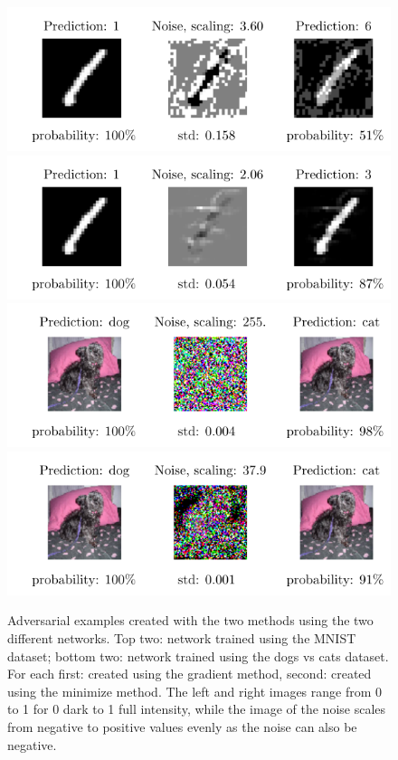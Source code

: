 \documentclass[%
 reprint,
 amsmath,amssymb,
 aps,
]{revtex4-1}
\begin{document}
\begin{figure}
\centering
\showthe\columnwidth
\includegraphics[width = 1\linewidth]{figures/mnist_model2_I0_f0277.pdf}
\includegraphics[width = 1\linewidth]{figures/adv_example_minimizer_mnist_0.pdf}
\includegraphics[width = 1\linewidth]{figures/cvd_model9_I0_f0003.pdf}
\includegraphics[width = 1\linewidth]{figures/adv_example_minimizer_dogs_vs_cats_0.pdf}
\caption{Adversarial examples created with the two methods using the two different networks. Top two: network trained using the MNIST dataset; bottom two: network trained using the dogs vs cats dataset. For each first: created using the gradient method, second: created using the minimize method. The left and right images range from 0 to 1 for 0 dark to 1 full intensity, while the image of the noise scales from negative to positive values evenly as the noise can also be negative.}
\label{fig:examples}
\end{figure}
\end{document}
